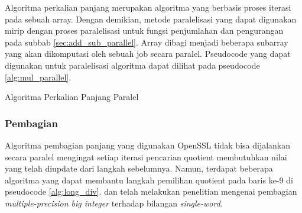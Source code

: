       Algoritma perkalian panjang merupakan algoritma yang berbasis proses iterasi pada sebuah array. Dengan demikian, metode paralelisasi yang dapat digunakan mirip dengan proses paralelisasi untuk fungsi penjumlahan dan pengurangan pada subbab \ref{sec:add_sub_parallel}. Array dibagi menjadi beberapa subarray yang akan dikomputasi oleh sebuah job secara paralel. Pseudocode yang dapat digunakan untuk paralelisasi algoritma dapat dilihat pada pseudocode \ref{alg:mul_parallel}.

      \begin{algorithm}
        \caption{Algoritma Perkalian Panjang Paralel}
        \label{alg:mul_parallel}
        \begin{algorithmic}[1]
          \Statex
          \State {}
          \EndFor
          \EndFor
          \State {}
          \EndFunction
        \end{algorithmic}
      \end{algorithm}

    \subsubsection{Pembagian}\label{sec:div_parallel}
      Algoritma pembagian panjang yang digunakan OpenSSL tidak bisa dijalankan secara paralel mengingat setiap iterasi pencarian quotient membutuhkan nilai yang telah diupdate dari langkah sebelumnya. Namun, terdapat beberapa algoritma yang dapat membantu langkah pemilihan quotient pada baris ke-9 di pseudocode \ref{alg:long_div}. \citet{parallel_short_div_emmart} dan \citet{parallel_short_div_takahashi} telah melakukan penelitian mengenai pembagian \textit{multiple-precision big integer} terhadap bilangan \textit{single-word}.

